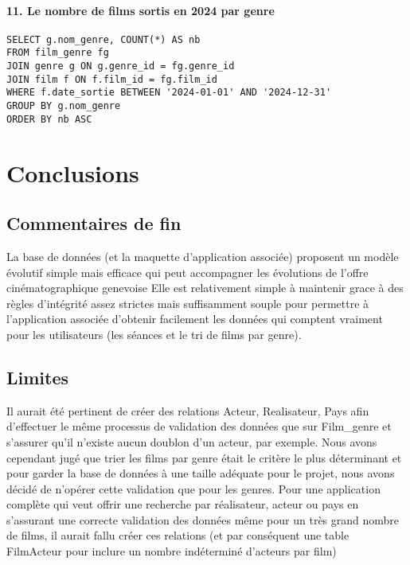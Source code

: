 \documentclass[12pt]{article}
\begin{document}
\paragraph*{11. Le nombre de films sortis en 2024 par genre}
\begin{verbatim}
SELECT g.nom_genre, COUNT(*) AS nb 
FROM film_genre fg  
JOIN genre g ON g.genre_id = fg.genre_id  
JOIN film f ON f.film_id = fg.film_id  
WHERE f.date_sortie BETWEEN '2024-01-01' AND '2024-12-31' 
GROUP BY g.nom_genre 
ORDER BY nb ASC 
\end{verbatim}
\pagebreak
\section{Conclusions}
\subsection{Commentaires de fin}
La base de données (et la maquette d'application associée) proposent un 
modèle évolutif simple mais efficace qui peut accompagner les évolutions 
de l'offre cinématographique genevoise
Elle est relativement simple à maintenir grace à des règles d'intégrité assez strictes mais suffisamment souple pour
permettre à l'application associée d'obtenir facilement les données qui comptent vraiment pour les utilisateurs (les séances et le
tri de films par genre).
\subsection{Limites}
Il aurait été pertinent de créer des relations Acteur, Realisateur, Pays afin d'effectuer le même
processus de validation des données que sur Film{\_}genre et s'assurer qu'il n'existe aucun doublon d'un acteur, par exemple. 
Nous avons cependant jugé que trier les films par genre était le critère le plus déterminant et pour garder la base de données
à une taille adéquate pour le projet, nous avons décidé de n'opérer cette validation que pour les genres. Pour une application
complète qui veut offrir une recherche par réalisateur, acteur ou pays en s'assurant une correcte validation des données même pour un très
grand nombre de films, il aurait fallu créer ces relations (et par conséquent une table FilmActeur pour inclure un nombre
indéterminé d'acteurs par film)
\end{document}
